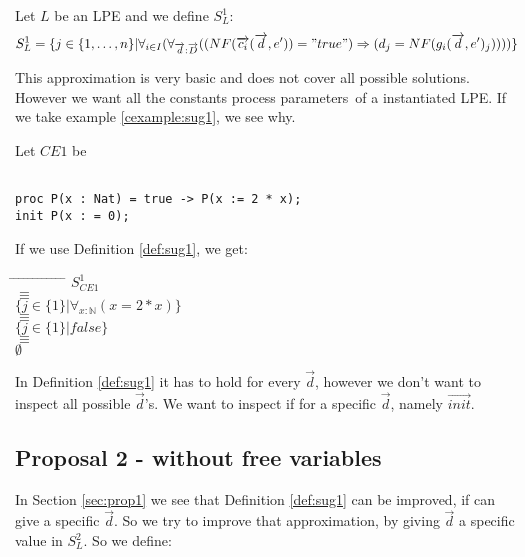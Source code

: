 \index{}\documentclass[a4paper,10pt]{article}
\theoremstyle{plain}
\theoremstyle{definition}
\newcommand{\ovr}{\overrightarrow}
\newcommand{\pps}{process parameters}
\newcommand{\tab}{\hspace*{5.mm} \= \hspace*{5.mm} \= \hspace*{5.mm} \= \hspace*{5.mm} \= \hspace*{5.mm} \= \hspace*{5.mm}  \= \hspace*{5.mm}  \= \hspace*{5.mm}  \= \hspace*{5.mm} \= \hspace*{5.mm} \= \hspace*{5.mm}  \= \hspace*{5.mm}  \= \hspace*{5.mm}\kill}
\begin{document}
\begin{defn} \label{def:sug1} Let $L$ be an LPE and we define $S_L^1$:
\begin{displaymath}
S_L^1 =
\lbrace   
j \in \lbrace 1, \ldots , n \rbrace \vert \forall_{i\in I} (\forall_{\ovr{d}: \ovr{D}}((NF(\ovr{c_i}(\ovr{d},e')) = "true")  \Rightarrow (d_j = NF(g_i(\ovr{d},e')_j))))\rbrace
\end{displaymath}

 
This approximation is very basic and does not cover all possible solutions. However we want all
the constants \pps\ of a instantiated LPE. If we take example
\ref{cexample:sug1}, we see why.
\begin{example}Let $CE1$ be \label{cexample:sug1}\begin{verbatim}

proc P(x : Nat) = true -> P(x := 2 * x);
init P(x : = 0);

\end{verbatim}
\end{example}
\begin{flushleft}
If we use Definition \ref{def:sug1}, we get:\\
\end{flushleft}
\begin{tabbing}
\tab
\> \> $S_{CE1}^1$\\
\> $\equiv$\\
\> \> $\lbrace j \in \lbrace 1 \rbrace \vert \forall_{x : \mathbb{N}}( x = 2 \ast x ) \rbrace $\\
\> $\equiv$ \\
\> \> $\lbrace j \in \lbrace 1 \rbrace \vert false \rbrace $\\
\> $\equiv$ \\
\> \> $\emptyset$ \\
\end{tabbing}
In Definition \ref{def:sug1} it has to hold for every $\ovr{d}$, however
we don't want to inspect all possible $\ovr{d}$'s. We want to inspect if for a specific $\ovr{d}$, namely $\ovr{init}$.
\end{defn}

\subsection{Proposal 2 - without free variables}
In Section \ref{sec:prop1} we see that Definition \ref{def:sug1} can be improved, if can give a specific $\ovr{d}$. So we try to improve that approximation, by giving $\ovr{d}$ a specific value in $S_L^2$. So we define: 
\end{document}
